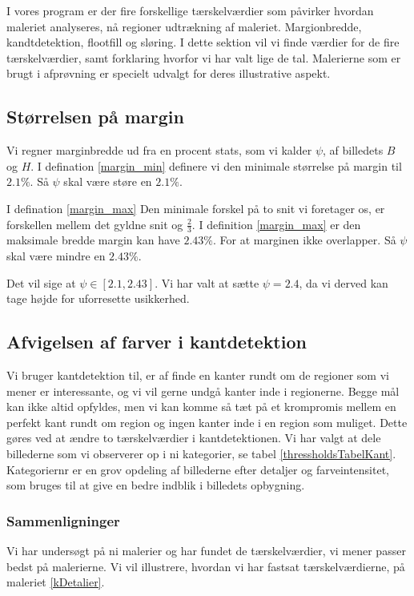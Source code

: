 {\sffamily
I vores program er der fire forskellige tærskelværdier som påvirker
hvordan maleriet analyseres, nå regioner udtrækning af maleriet.
Margionbredde, kandtdetektion, flootfill og sløring. I dette sektion vil
vi finde værdier for de fire tærskelværdier, samt forklaring hvorfor vi
har valt lige de tal. Malerierne som er brugt i afprøvning er specielt
udvalgt for deres illustrative aspekt. 
}

\subsection{Størrelsen på margin}
Vi regner marginbredde ud fra en procent stats, som vi kalder $\psi$, af
billedets $B$ og $H$. I defination \ref{margin_min} definere vi den
minimale størrelse på margin til $2.1 \%$. Så $\psi$ skal være støre en
$2.1 \%$. 

I defination \ref{margin_max}
Den minimale forskel på to snit vi foretager os, er forskellen mellem
det gyldne snit og $\frac{2}{3}$. I definition \ref{margin_max} er den
maksimale bredde margin kan have $2.43\%$. For at marginen ikke
overlapper. Så $\psi$ skal være mindre en $2.43\%$. 

Det vil sige at $\psi \in [2.1, 2.43]$. Vi har valt at
sætte $\psi = 2.4$, da vi derved kan tage højde for uforresette
usikkerhed.

\subsection{Afvigelsen af farver i kantdetektion}
Vi bruger kantdetektion til, er af finde en kanter rundt om de regioner
som vi mener er interessante, og vi vil gerne undgå kanter inde i
regionerne. Begge mål kan ikke altid opfyldes, men vi kan komme så tæt
på et krompromis mellem en perfekt kant rundt om region og ingen kanter
inde i en region som muliget. Dette gøres ved at ændre to tærskelværdier
i kantdetektionen. Vi har valgt at dele billederne som vi observerer op
i ni kategorier, se tabel \ref{thressholdsTabelKant}. Kategoriernr er en
grov opdeling af billederne efter detaljer og farveintensitet, som
bruges til at give en bedre indblik i billedets opbygning.

\subsubsection{Sammenligninger}
Vi har undersøgt på ni malerier og har fundet de tærskelværdier, vi mener
passer bedst på malerierne. Vi vil illustrere, hvordan vi har fastsat
tærskelværdierne, på maleriet \ref{kDetalier}.

